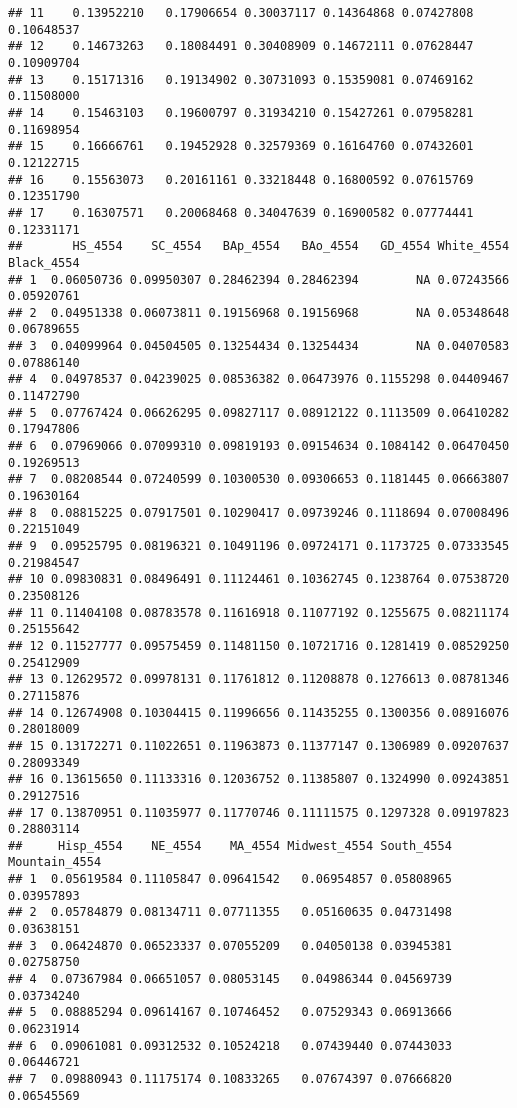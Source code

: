\documentclass[
]{article}
\begin{document}
\begin{verbatim}
## 11    0.13952210   0.17906654 0.30037117 0.14364868 0.07427808 0.10648537
## 12    0.14673263   0.18084491 0.30408909 0.14672111 0.07628447 0.10909704
## 13    0.15171316   0.19134902 0.30731093 0.15359081 0.07469162 0.11508000
## 14    0.15463103   0.19600797 0.31934210 0.15427261 0.07958281 0.11698954
## 15    0.16666761   0.19452928 0.32579369 0.16164760 0.07432601 0.12122715
## 16    0.15563073   0.20161161 0.33218448 0.16800592 0.07615769 0.12351790
## 17    0.16307571   0.20068468 0.34047639 0.16900582 0.07774441 0.12331171
##       HS_4554    SC_4554   BAp_4554   BAo_4554   GD_4554 White_4554 Black_4554
## 1  0.06050736 0.09950307 0.28462394 0.28462394        NA 0.07243566 0.05920761
## 2  0.04951338 0.06073811 0.19156968 0.19156968        NA 0.05348648 0.06789655
## 3  0.04099964 0.04504505 0.13254434 0.13254434        NA 0.04070583 0.07886140
## 4  0.04978537 0.04239025 0.08536382 0.06473976 0.1155298 0.04409467 0.11472790
## 5  0.07767424 0.06626295 0.09827117 0.08912122 0.1113509 0.06410282 0.17947806
## 6  0.07969066 0.07099310 0.09819193 0.09154634 0.1084142 0.06470450 0.19269513
## 7  0.08208544 0.07240599 0.10300530 0.09306653 0.1181445 0.06663807 0.19630164
## 8  0.08815225 0.07917501 0.10290417 0.09739246 0.1118694 0.07008496 0.22151049
## 9  0.09525795 0.08196321 0.10491196 0.09724171 0.1173725 0.07333545 0.21984547
## 10 0.09830831 0.08496491 0.11124461 0.10362745 0.1238764 0.07538720 0.23508126
## 11 0.11404108 0.08783578 0.11616918 0.11077192 0.1255675 0.08211174 0.25155642
## 12 0.11527777 0.09575459 0.11481150 0.10721716 0.1281419 0.08529250 0.25412909
## 13 0.12629572 0.09978131 0.11761812 0.11208878 0.1276613 0.08781346 0.27115876
## 14 0.12674908 0.10304415 0.11996656 0.11435255 0.1300356 0.08916076 0.28018009
## 15 0.13172271 0.11022651 0.11963873 0.11377147 0.1306989 0.09207637 0.28093349
## 16 0.13615650 0.11133316 0.12036752 0.11385807 0.1324990 0.09243851 0.29127516
## 17 0.13870951 0.11035977 0.11770746 0.11111575 0.1297328 0.09197823 0.28803114
##     Hisp_4554    NE_4554    MA_4554 Midwest_4554 South_4554 Mountain_4554
## 1  0.05619584 0.11105847 0.09641542   0.06954857 0.05808965    0.03957893
## 2  0.05784879 0.08134711 0.07711355   0.05160635 0.04731498    0.03638151
## 3  0.06424870 0.06523337 0.07055209   0.04050138 0.03945381    0.02758750
## 4  0.07367984 0.06651057 0.08053145   0.04986344 0.04569739    0.03734240
## 5  0.08885294 0.09614167 0.10746452   0.07529343 0.06913666    0.06231914
## 6  0.09061081 0.09312532 0.10524218   0.07439440 0.07443033    0.06446721
## 7  0.09880943 0.11175174 0.10833265   0.07674397 0.07666820    0.06545569

\end{verbatim}
\end{document}
